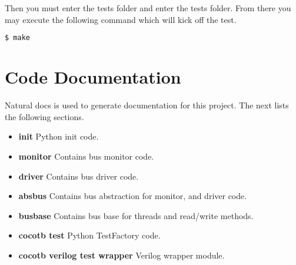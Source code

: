 Then you must enter the tests folder and enter the tests folder. From there you may execute the following command
which will kick off the test.
\begin{lstlisting}[language=bash]
  $ make
\end{lstlisting}

\newpage

\section{Code Documentation} \label{Code Documentation}

\par
Natural docs is used to generate documentation for this project. The next lists the following sections.

\begin{itemize}
  \item \textbf{init} Python init code.\\
  \item \textbf{monitor} Contains bus monitor code.\\
  \item \textbf{driver} Contains bus driver code.\\
  \item \textbf{absbus} Contains bus abstraction for monitor, and driver code.\\
  \item \textbf{busbase} Contains bus base for threads and read/write methods.\\
  \item \textbf{cocotb test} Python TestFactory code.\\
  \item \textbf{cocotb verilog test wrapper} Verilog wrapper module.\\
\end{itemize}

